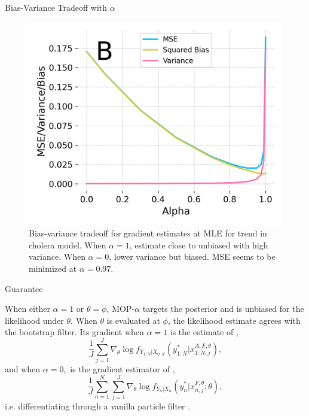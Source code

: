 \documentclass{beamer}
\begin{document}
\begin{frame}{Bias-Variance Tradeoff with $\alpha$}
\begin{figure}
    \centering
    \includegraphics[scale=0.5]{imgs/095/biasvar.png}
    \caption{Bias-variance tradeoff for gradient estimates at MLE for trend in \cite{king08} cholera model. When $\alpha=1$, estimate close to unbiased with high variance. When $\alpha=0$, lower variance but biased. MSE seems to be minimized at $\alpha=0.97$.}
    \label{fig:bias-variance}
\end{figure}
    
\end{frame}

\begin{frame}{Guarantee}
    \begin{prop}
    \label{prop:mop-correctness}
    When either $\alpha=1$ or $\theta=\phi$, MOP-$\alpha$ targets the posterior and is unbiased for the likelihood under $\theta$. 
    When $\theta$ is evaluated at $\phi$, the likelihood estimate agrees with the bootstrap filter. Its gradient when $\alpha=1$ is the estimate of \citet{poyiadjis11},
    $$\frac{1}{J}\sum_{j=1}^J \nabla_\theta \log f_{Y_{1:N}|X_{0:N}}(y_{1:N}^*|x_{1:N,j}^{A, F,\theta}),$$
    and when $\alpha=0,$ is the gradient estimator of \cite{naesseth18},
    $$
        \frac{1}{J} \sum_{n=1}^N \sum_{j=1}^J \nabla_\theta \log f_{Y_n|X_{n}}(y_n^*|x_{n,j}^{F, \theta}; \theta),
    $$
    i.e. differentiating through a vanilla particle filter \citep{scibior21}.
\end{prop}
\end{frame}
\end{document}
